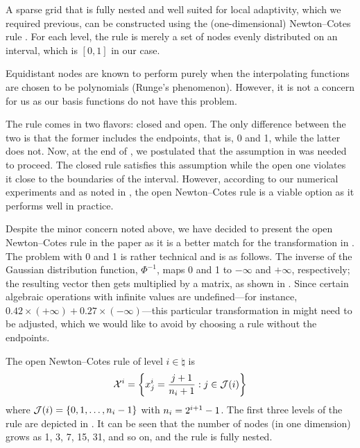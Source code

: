 A sparse grid that is fully nested and well suited for local adaptivity, which
we required previous, can be constructed using the (one-dimensional)
Newton--Cotes rule \cite{klimke2006, ma2009}. For each level, the rule is merely
a set of nodes evenly distributed on an interval, which is $[0, 1]$ in our case.

\begin{remark}
Equidistant nodes are known to perform purely when the interpolating functions
are chosen to be polynomials (Runge's phenomenon). However, it is not a concern
for us as our basis functions do not have this problem.
\end{remark}

The rule comes in two flavors: closed and open. The only difference between the
two is that the former includes the endpoints, that is, 0 and 1, while the
latter does not. Now, at the end of , we postulated that
the assumption in  was needed to proceed. The closed rule
satisfies this assumption while the open one violates it close to the boundaries
of the interval. However, according to our numerical experiments and as noted in
\cite{klimke2006}, the open Newton--Cotes rule is a viable option as it performs
well in practice.

Despite the minor concern noted above, we have decided to present the open
Newton--Cotes rule in the paper as it is a better match for the transformation
in . The problem with 0 and 1 is rather technical and is as
follows. The inverse of the Gaussian distribution function, $\Phi^{-1}$, maps 0
and 1 to $-\infty$ and $+\infty$, respectively; the resulting vector then gets
multiplied by a matrix, as shown in . Since certain
algebraic operations with infinite values are undefined---for instance, $0.42
\times (+\infty) + 0.27 \times (-\infty)$---this particular transformation in
 might need to be adjusted, which we would like to avoid by
choosing a rule without the endpoints.


The open Newton--Cotes rule of level $i \in \natural$ is
\[
  \mathcal{X}^i = \left\{ x^i_j = \frac{j + 1}{n_i + 1}: j \in \mathcal{J}(i) \right\}
\]
where $\mathcal{J}(i) = \left\{ 0, 1, \dots, n_i - 1 \right\}$ with $n_i = 2^{i +
1} - 1$. The first three levels of the rule are depicted in . It can
be seen that the number of nodes (in one dimension) grows as 1, 3, 7, 15, 31,
and so on, and the rule is fully nested. 
